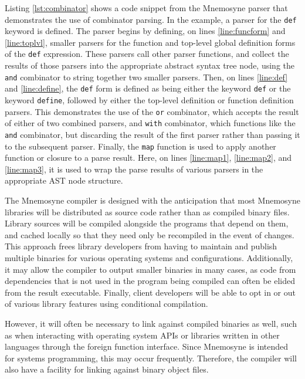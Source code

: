 \documentclass[11pt,a4paper]{article}
\theoremstyle{break}
\begin{document}
Listing \ref{lst:combinator} shows a code snippet from the Mnemosyne parser that demonstrates the use of combinator parsing. In the example, a parser for the \texttt{def} keyword is defined. The parser begins by defining, on lines \ref{line:funcform} and \ref{line:toplvl}, smaller parsers for the function and top-level global definition forms of the \texttt{def} expression. These parsers call other parser functions, and collect the results of those parsers into the appropriate abstract syntax tree node, using the \texttt{and} combinator to string together two smaller parsers. Then, on lines \ref{line:def} and \ref{line:define}, the \texttt{def} form is defined as being either the keyword \texttt{def} or the keyword \texttt{define}, followed by either the top-level definition or function definition parsers. This demonstrates the use of the \texttt{or} combinator, which accepts the result of either of two combined parsers, and \texttt{with} combinator, which functions like the \texttt{and} combinator, but discarding the result of the first parser rather than passing it to the subsequent parser. Finally, the \texttt{map} function is used to apply another function or closure to a parse result. Here, on lines \ref{line:map1}, \ref{line:map2}, and \ref{line:map3}, it is used to wrap the parse results of various parsers in the appropriate AST node structure.

The Mnemosyne compiler is designed with the anticipation that most Mnemosyne libraries will be distributed as source code rather than as compiled binary files. Library sources will be compiled alongside the programs that depend on them, and cached locally so that they need only be recompiled in the event of changes. This approach frees library developers from having to maintain and publish multiple binaries for various operating systems and configurations. Additionally, it may allow the compiler to output smaller binaries in many cases, as code from dependencies that is not used in the program being compiled can often be elided from the result executable. Finally, client developers will be able to opt in or out of various library features using conditional compilation.

However, it will often be necessary to link against compiled binaries as well, such as when interacting with operating system APIs or libraries written in other languages through the foreign function interface. Since Mnemosyne is intended for systems programming, this may occur frequently. Therefore, the compiler will also have a facility for linking against binary object files.
\end{document}
